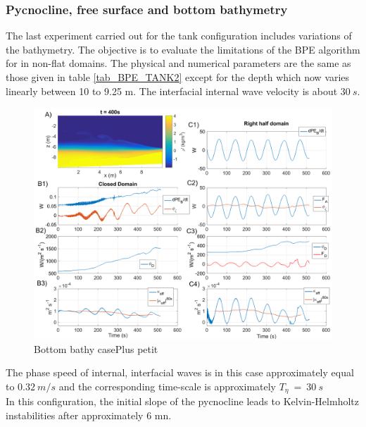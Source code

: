 \subsubsection{Pycnocline, free surface and bottom bathymetry}
The last experiment carried out for the tank configuration includes variations of the bathymetry. The objective is to evaluate the limitations of the BPE algorithm for in non-flat domains. The physical and numerical parameters are the same as those given in table \ref{tab_BPE_TANK2} except for the depth which now varies linearly between 10 to 9.25 m. The interfacial internal wave velocity is about $30\ s$.\\
\begin{figure}[h!]
\includegraphics[width=1.\textwidth]{./CHAP_BPE/Fig_TANK_pycbath.png}
\caption{Bottom bathy case\color{red}Plus petit\color{black}}
\label{figCbath}
\end{figure}
The phase speed of internal, interfacial waves is in this case approximately equal to $0.32\ m/s$ and the corresponding time-scale is approximately $T_{\eta}\ =\ 30\ s$\\
In this configuration, the initial slope of the pycnocline leads to Kelvin-Helmholtz instabilities after approximately 6 mn.\\
